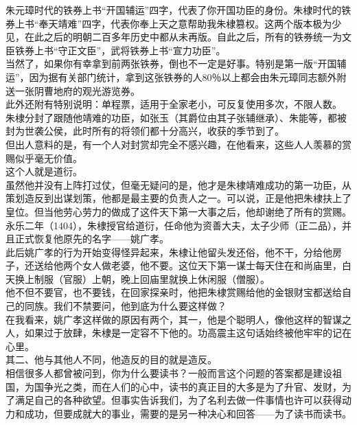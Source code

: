\begin{multicols}{\theparacolNo}
朱元璋时代的铁券上书“开国辅运”四字，代表了你开国功臣的身份。朱棣时代的铁券上书“奉天靖难”四字，代表你奉上天之意帮助我朱棣篡权。这两个版本极为少见，在此之后的明朝二百多年历史中都从未再版。自此之后，所有的铁券统一为文臣铁券上书“守正文臣”，武将铁券上书“宣力功臣”。\\

当然了，如果你有幸拿到前两张铁券，倒也不一定是好事。特别是第一版“开国辅运”，因为据有关部门统计，拿到这张铁券的人80％以上都会由朱元璋同志额外附送一张阴曹地府的观光游览券。\\

此外还附有特别说明：单程票，适用于全家老小，可反复使用多次，不限人数。\\

朱棣分封了跟随他靖难的功臣，如张玉（其爵位由其子张辅继承）、朱能等，都被封为世袭公侯，此时所有的将领们都十分高兴，收获的季节到了。\\

但出人意料的是，有一个人对封赏却完全不感兴趣，在他看来，这些人人羡慕的赏赐似乎毫无价值。\\

这个人就是道衍。\\

虽然他并没有上阵打过仗，但毫无疑问的是，他才是朱棣靖难成功的第一功臣，从策划造反到出谋划策，他都是最主要的负责人之一。可以说，正是他把朱棣扶上了皇位。但当他劳心劳力的做成了这件天下第一大事之后，他却谢绝了所有的赏赐。永乐二年（1404），朱棣授官给道衍，任命他为资善大夫，太子少师（正二品），并且正式恢复他原先的名字——姚广孝。\\

此后姚广孝的行为开始变得怪异起来，朱棣让他留头发还俗，他不干，分给他房子，还送给他两个女人做老婆，他不要。这位天下第一谋士每天住在和尚庙里，白天换上制服（官服）上朝，晚上回庙里就换上休闲服（僧服）。\\

他不但不要官，也不要钱，在回家探亲时，他把朱棣赏赐给他的金银财宝都送给自己的同族。我们不禁要问，他到底为什么要这样做？\\

在我看来，姚广孝这样做的原因有两个，其一，他是个聪明人，像他这样的智谋之人，如果过于放肆，朱棣是一定容不下他的。功高震主这句话始终被他牢牢的记在心里。\\

其二、他与其他人不同，他造反的目的就是造反。\\

相信很多人都曾被问到，你为什么要读书？一般而言这个问题的答案都是建设祖国，为国争光之类，而在人们的心中，读书的真正目的大多是为了升官、发财，为了满足自己的各种欲望。但事实告诉我们，为了名利去做一件事情也许可以获得动力和成功，但要成就大的事业，需要的是另一种决心和回答——为了读书而读书。\\


\end{multicols}
